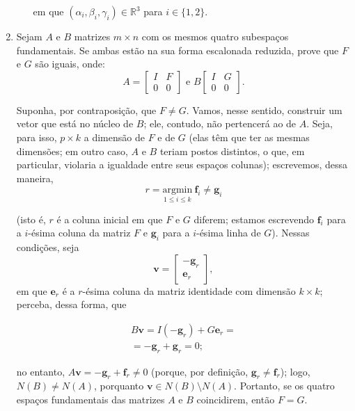 \documentclass[leqno]{article}
\begin{document}
\begin{enumerate}
\begin{enumerate}
\begin{sol}
		\noindent em que $(\alpha_{i}, \beta_{i}, \gamma_{i}) \in \mathbb{R}^{3}$ para $i \in \{1, 2\}$.  
	\end{sol} 
\end{enumerate}

\item Sejam $A$ e $B$ matrizes $m \times n$ com os mesmos quatro subespaços fundamentais. Se ambas estão na sua forma escalonada reduzida, prove que $F$ e $G$ são iguais, onde:
$$A = \begin{bmatrix}
I & F \\
0 & 0
\end{bmatrix} \mbox{ e } B \begin{bmatrix}
I & G \\
0 & 0
\end{bmatrix}.$$

\begin{sol} 
	Suponha, por contraposição, que $F \neq G$. Vamos, nesse sentido, construir um vetor que está no núcleo de $B$; ele, contudo, não pertencerá ao de $A$. Seja, para isso, $p \times k$ a dimensão de $F$ e de $G$ (elas têm que ter as mesmas dimensões; em outro caso, $A$ e $B$ teriam postos distintos, o que, em particular, violaria a igualdade entre seus espaços colunas); escrevemos, dessa maneira, 
	\begin{equation*} 
		r = \underset{1 \le i \le k}{\mathrm{arg min}} \ \mathbf{f}_{i} \neq \mathbf{g}_{i} 
	\end{equation*} 

	\noindent (isto é, $r$ é a coluna inicial em que $F$ e $G$ diferem; estamos escrevendo $\mathbf{f}_{i}$ para a $i$-ésima coluna da matriz $F$ e $\mathbf{g}_{i}$ para a $i$-ésima linha de $G$). Nessas condições, seja 
	\begin{equation*} 
		\mathbf{v} = 
		\begin{bmatrix} 
			-\mathbf{g}_{r} \\ 
			\mathbf{e}_{r} 
		\end{bmatrix}, 
	\end{equation*} 
	\noindent em que $\mathbf{e}_{r}$ é a $r$-ésima coluna da matriz identidade com dimensão $k \times k$; perceba, dessa forma, que 

	\begin{equation*} 
		\begin{split} 
			B\mathbf{v} = I(-\mathbf{g}_{r}) + G\mathbf{e}_{r} = \\ 
			= -\mathbf{g}_{r} + \mathbf{g}_{r} = 0; 
		\end{split}    
	\end{equation*} 

	\noindent no entanto, $A\mathbf{v} = -\mathbf{g}_{r} + \mathbf{f}_{r} \neq 0$ (porque, por definição, $\mathbf{g}_{r} \neq \mathbf{f}_{r}$); logo, $N(B) \neq N(A)$, porquanto $\mathbf{v} \in N(B)\setminus N(A)$. Portanto, se os quatro espaços fundamentais das matrizes $A$ e $B$ coincidirem, então $F = G$.   
\end{sol} 
\end{enumerate}
\end{document}
